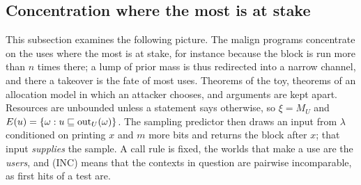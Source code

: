 \providecommand{\cW}{\mathcal W}\providecommand{\cM}{\mathcal M}\providecommand{\cX}{\mathcal X}
\subsection{Concentration where the most is at stake}\label{sec:stakes}

This subsection examines the following picture. The malign programs concentrate on the uses where the most
is at stake, for instance because the block is run more than $n$ times there; a lump of prior mass is thus
redirected into a narrow channel, and there a takeover is the fate of most uses. Theorems of the toy,
theorems of an allocation model in which an attacker chooses, and arguments are kept apart. Resources are
unbounded unless a statement says otherwise, so $\xi=M_U$ and $E(u)=\{\omega:u\sqsubseteq\mathrm{out}_U(\omega)\}$. The
sampling predictor then draws an input from $\lambda$ conditioned on printing $x$ and $m$ more bits and
returns the block after $x$; that input \emph{supplies} the sample. A call rule is fixed, the worlds that
make a use are the \emph{users}, and (INC) means that the contexts in question are pairwise incomparable, as
first hits of a test are.

